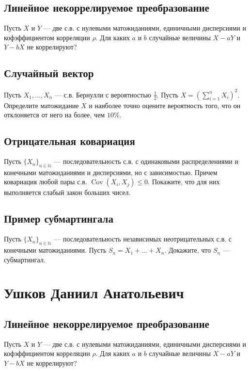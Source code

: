\documentclass[12pt]{article}
\newcommand\N{\mathbb{N}}
\DeclareMathOperator{\Cov}{Cov}
\begin{document}
\subsection{Линейное некоррелируемое преобразование}

Пусть $X$ и $Y$ --- две с.в. с нулевыми матожиданиями, единичными дисперсиями и кофэффициентом корреляции $\rho$. Для каких $a$ и $b$ случайные величины $X - aY$ и $Y - bX$ не коррелируют?


\subsection{Случайный вектор}

Пусть $X_1, \dots, X_n$ --- с.в. Бернулли с вероятностью $\frac{1}{2}$. Пусть $X = (\sum_{i = 1}^n X_i)^2$. Определите матожидание $X$ и наиболее точно оцените вероятность того, что он отклоняется от него на более, чем $10\%$.


\subsection{Отрицательная ковариация}

Пусть $\{X_n\}_{n \in \N}$ --- последовательность с.в. с одинаковыми распределениями и конечными матожиданиями и дисперсиями, но с зависимостью. Причем ковариация любой пары с.в. $\Cov(X_i, X_j) \le 0$. Покажите, что для них выполняется слабый закон больших чисел.


\subsection{Пример субмартингала}

Пусть $\{X_n\}_{n \in \N}$ --- последовательность независимых неотрицательных с.в. с конечными матожиданиями. Пусть $S_n = X_1 + \dots + X_n$. Докажите, что $S_n$ --- субмартингал.

\newpage
\section{Ушков Даниил Анатольевич}

\subsection{Линейное некоррелируемое преобразование}

Пусть $X$ и $Y$ --- две с.в. с нулевыми матожиданиями, единичными дисперсиями и кофэффициентом корреляции $\rho$. Для каких $a$ и $b$ случайные величины $X - aY$ и $Y - bX$ не коррелируют?
\end{document}
